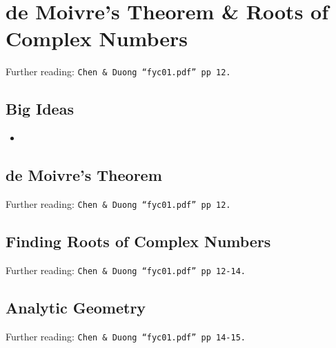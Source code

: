 \chapter{de Moivre's Theorem \& Roots of Complex Numbers}
\label{chap:dMT}
Further reading: \texttt{Chen \& Duong ``fyc01.pdf'' pp 12.}

\section{Big Ideas}
\label{sec:dMT Big Ideas}
\begin{itemize}
  \item 
\end{itemize}

\section{de Moivre's Theorem}
\label{sec:dMT dMT}
Further reading: \texttt{Chen \& Duong ``fyc01.pdf'' pp 12.}

\section{Finding Roots of Complex Numbers}
\label{sec:dMT Finding Roots of Complex Numbers}
Further reading: \texttt{Chen \& Duong ``fyc01.pdf'' pp 12-14.}

\section{Analytic Geometry}
\label{sec:dMT Analytic Geometry}
Further reading: \texttt{Chen \& Duong ``fyc01.pdf'' pp 14-15.}